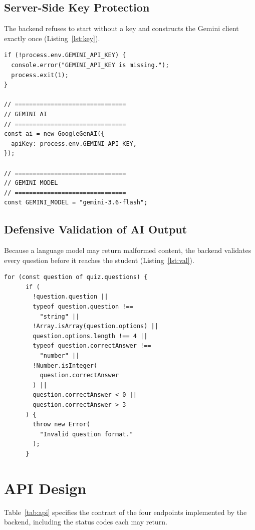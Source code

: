 \documentclass[12pt,a4paper,oneside]{report}
\begin{document}
\subsection{Server-Side Key Protection}
The backend refuses to start without a key and constructs the Gemini client exactly
once (Listing~\ref{lst:key}).

\begin{lstlisting}[caption={API key guard and Gemini client in backend/server.js, lines 31--46}, label={lst:key}]
if (!process.env.GEMINI_API_KEY) {
  console.error("GEMINI_API_KEY is missing.");
  process.exit(1);
}

// ===============================
// GEMINI AI
// ===============================
const ai = new GoogleGenAI({
  apiKey: process.env.GEMINI_API_KEY,
});

// ===============================
// GEMINI MODEL
// ===============================
const GEMINI_MODEL = "gemini-3.6-flash";
\end{lstlisting}

\subsection{Defensive Validation of AI Output}
Because a language model may return malformed content, the backend validates every
question before it reaches the student (Listing~\ref{lst:val}).

\begin{lstlisting}[caption={Quiz payload validation in backend/server.js, lines 461--479}, label={lst:val}]
    for (const question of quiz.questions) {
      if (
        !question.question ||
        typeof question.question !==
          "string" ||
        !Array.isArray(question.options) ||
        question.options.length !== 4 ||
        typeof question.correctAnswer !==
          "number" ||
        !Number.isInteger(
          question.correctAnswer
        ) ||
        question.correctAnswer < 0 ||
        question.correctAnswer > 3
      ) {
        throw new Error(
          "Invalid question format."
        );
      }
\end{lstlisting}

\section{API Design}

Table~\ref{tab:api} specifies the contract of the four endpoints implemented by the backend, including the status codes each may return.
\end{document}
